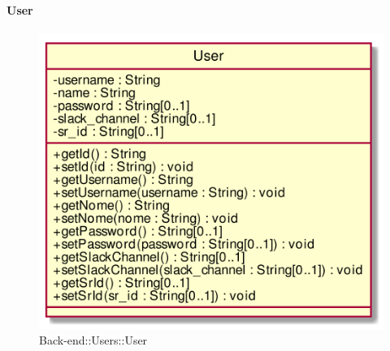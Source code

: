 \hypertarget{User_label}{\paragraph{User}}
\begin{figure}[h]
	\centering
	\includegraphics[width=\textwidth,height=\textheight,keepaspectratio]{images/ClassUser.png}
	\caption{Back-end::Users::User}
\end{figure}
